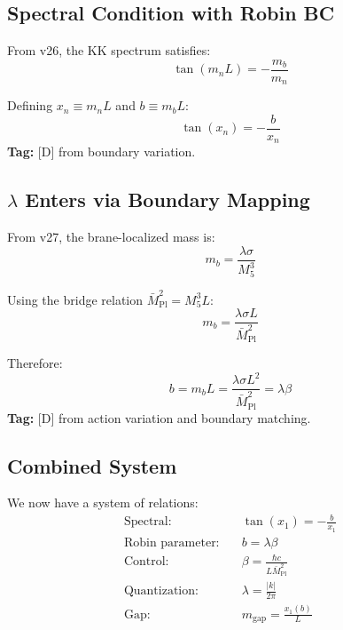 \documentclass[11pt,a4paper]{article}
\begin{document}
\subsection{Spectral Condition with Robin BC}

From v26, the KK spectrum satisfies:
\begin{equation}
  \tan(m_n L) = -\frac{m_b}{m_n}
  \label{eq:spectral-robin}
\end{equation}

Defining $x_n \equiv m_n L$ and $b \equiv m_b L$:
\begin{equation}
  \boxed{\tan(x_n) = -\frac{b}{x_n}}
  \label{eq:spectral-dimensionless}
\end{equation}
\textbf{Tag:} [D] from boundary variation.

\subsection{$\lambda$ Enters via Boundary Mapping}

From v27, the brane-localized mass is:
\begin{equation}
  m_b = \frac{\lambda \sigma}{M_5^3}
  \label{eq:mb-from-lambda}
\end{equation}

Using the bridge relation $\bar{M}_{\text{Pl}}^2 = M_5^3 L$:
\begin{equation}
  m_b = \frac{\lambda \sigma L}{\bar{M}_{\text{Pl}}^2}
  \label{eq:mb-bridge}
\end{equation}

Therefore:
\begin{equation}
  b = m_b L = \frac{\lambda \sigma L^2}{\bar{M}_{\text{Pl}}^2} = \lambda \beta
  \label{eq:b-lambda-beta}
\end{equation}
\textbf{Tag:} [D] from action variation and boundary matching.

\subsection{Combined System}

We now have a system of relations:
\begin{align}
  \text{Spectral:} & \quad \tan(x_1) = -\frac{b}{x_1}
  \label{eq:system-spectral} \\
  \text{Robin parameter:} & \quad b = \lambda \beta
  \label{eq:system-b} \\
  \text{Control:} & \quad \beta = \frac{\hbar c}{L \bar{M}_{\text{Pl}}^2}
  \label{eq:system-beta} \\
  \text{Quantization:} & \quad \lambda = \frac{|k|}{2\pi}
  \label{eq:system-lambda} \\
  \text{Gap:} & \quad m_{\text{gap}} = \frac{x_1(b)}{L}
  \label{eq:system-gap}
\end{align}
\end{document}
